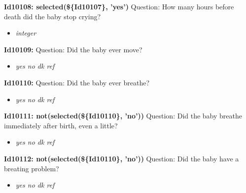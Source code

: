 \documentclass{article}%
\begin{document}
\textbf{Id10108: selected(\$\{Id10107\}, 'yes')\newline%
}%
Question: How many hours before death did the baby stop crying?\newline%
%
\begin{itemize}%
\item%
\textit{integer\newline%
}%
\end{itemize}%
\textbf{Id10109: \newline%
}%
Question: Did the baby ever move?\newline%
%
\begin{itemize}%
\item%
\textit{yes\newline%
 no\newline%
 dk\newline%
 ref\newline%
}%
\end{itemize}%
\textbf{Id10110: \newline%
}%
Question: Did the baby ever breathe?\newline%
%
\begin{itemize}%
\item%
\textit{yes\newline%
 no\newline%
 dk\newline%
 ref\newline%
}%
\end{itemize}%
\textbf{Id10111: not(selected(\$\{Id10110\}, 'no'))\newline%
}%
Question: Did the baby breathe immediately after birth, even a little?\newline%
%
\begin{itemize}%
\item%
\textit{yes\newline%
 no\newline%
 dk\newline%
 ref\newline%
}%
\end{itemize}%
\textbf{Id10112: not(selected(\$\{Id10110\}, 'no'))\newline%
}%
Question: Did the baby have a breating problem?\newline%
%
\begin{itemize}%
\item%
\textit{yes\newline%
 no\newline%
 dk\newline%
 ref\newline%
}%
\end{itemize}%
\end{document}
